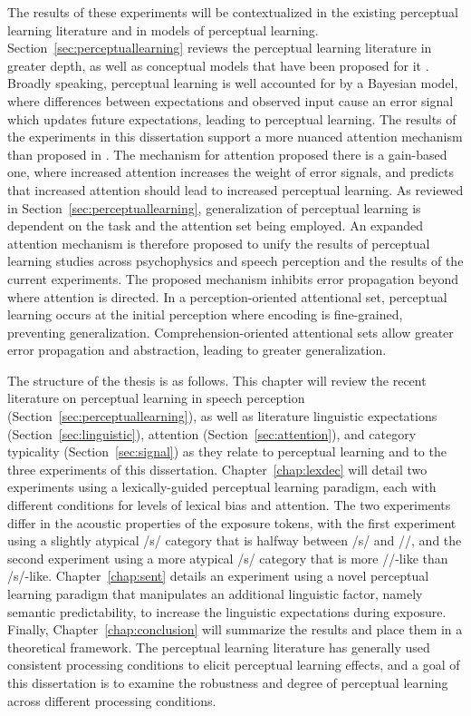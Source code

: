 The results of these experiments will be contextualized in the existing perceptual learning literature and in models of perceptual learning.
Section~\ref{sec:perceptuallearning} reviews the perceptual learning literature in greater depth, as well as conceptual models that have been proposed for it \citep{Clark2013, Kleinschmidt2011}.
Broadly speaking, perceptual learning is well accounted for by a Bayesian model, where differences between expectations and observed input cause an error signal which updates future expectations, leading to perceptual learning.
The results of the experiments in this dissertation support a more nuanced attention mechanism than proposed in \citet{Clark2013}.
The mechanism for attention proposed there is a gain-based one, where increased attention increases the weight of error signals, and predicts that increased attention should lead to increased perceptual learning.
As reviewed in Section~\ref{sec:perceptuallearning}, generalization of perceptual learning is dependent on the task and the attention set being employed.
An expanded attention mechanism is therefore proposed to unify the results of perceptual learning studies across psychophysics and speech perception and the results of the current experiments.
The proposed mechanism inhibits error propagation beyond where attention is directed.  In a perception-oriented attentional set, perceptual learning occurs at the initial perception where encoding is fine-grained, preventing generalization.  
Comprehension-oriented attentional sets allow greater error propagation and abstraction, leading to greater generalization.

The structure of the thesis is as follows.
This chapter will review the recent literature on perceptual learning in speech perception (Section~\ref{sec:perceptuallearning}), as well as literature linguistic expectations (Section~\ref{sec:linguistic}), attention (Section~\ref{sec:attention}), and category typicality (Section~\ref{sec:signal}) as they relate to perceptual learning and to the three experiments of this dissertation.
Chapter~\ref{chap:lexdec} will detail two experiments using a lexically-guided perceptual learning paradigm, each with different conditions for levels of lexical bias and attention.  
The two experiments differ in the acoustic properties of the exposure tokens, with the first experiment using a slightly atypical /s/ category that is halfway between /s/ and /\textesh/, and the second experiment using a more atypical /s/ category that is more /\textesh/-like than /s/-like.  
Chapter~\ref{chap:sent} details an experiment using a novel perceptual learning paradigm that manipulates an additional linguistic factor, namely semantic predictability, to increase the linguistic expectations during exposure.
Finally, Chapter~\ref{chap:conclusion} will summarize the results and place them in a theoretical framework.
The perceptual learning literature has generally used consistent processing conditions to elicit perceptual learning effects, and a goal of this dissertation is to examine the robustness and degree of perceptual learning across different processing conditions.

